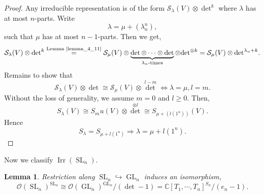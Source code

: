 \documentclass[10pt]{article}
\newtheorem{lemma}{Lemma}[section]
\numberwithin{equation}{theorem}
\DeclareMathOperator{\Irr}{Irr}
\DeclareMathOperator{\GL}{GL}
\DeclareMathOperator{\SL}{SL}
\newcommand{\Ouv}[0]{\mathcal{O}}
\newcommand{\C}[0]{\mathbb{C}}
\begin{document}
\begin{proof}
  Any irreducible representation is of the form $\mathcal{S}_\lambda(V)\otimes {\det}^k$ where $\lambda$ has at most $n$-parts. Write 
  \begin{equation*}
    \lambda = \mu + (\lambda_n^n),
  \end{equation*}
  such that $\mu$ has at most $n-1$-parts. Then we get,
  \begin{equation*}
    \mathcal{S}_\lambda(V)\otimes {\det}^k \stackrel{\text{Lemma \ref{lemma_4_11}}}{=}\mathcal{S}_\mu(V)\otimes \underbrace{\det\otimes\cdots\otimes \det}_{\text{$\lambda_n$-times}}\otimes {\det}^{\otimes k} = \mathcal{S}_\mu(V)\otimes {\det}^{\lambda_n+k}. 
  \end{equation*}
  Remains to show that 
  \begin{equation*}
    \mathcal{S}_\lambda(V)\otimes {\det}\cong \mathcal{S}_\mu(V)\otimes {\det}^{l-m}\Leftrightarrow \lambda=\mu,l=m.
  \end{equation*}
  Without the loss of generality, we assume $m=0$ and $l\geq0$. Then,
  \begin{equation*}
    S_\lambda(V)\cong S_mu(V)\otimes {\det}^{\otimes l} \cong S_{\mu+(l(1^n))}(V).
  \end{equation*}
  Hence 
  \begin{equation*}
    S_\lambda = S_{\mu+l(1^n)}\Rightarrow\lambda = \mu+l(1^n).
  \end{equation*}
\end{proof}
Now we classify $\Irr(\SL_n)$. 
\begin{lemma}
  \label{lemma_4_13}
  Restriction along $\SL_n\hookrightarrow\GL_n$ induces an isomorphism,
  \begin{equation*}
    \Ouv(\SL_n)^{\SL_n}\cong \Ouv(\GL_n)^{\GL_n}/(\det -1)= \C[T_1,\cdots,T_n]^{S_n}/(e_n-1).
  \end{equation*}
\end{lemma}
\end{document}
